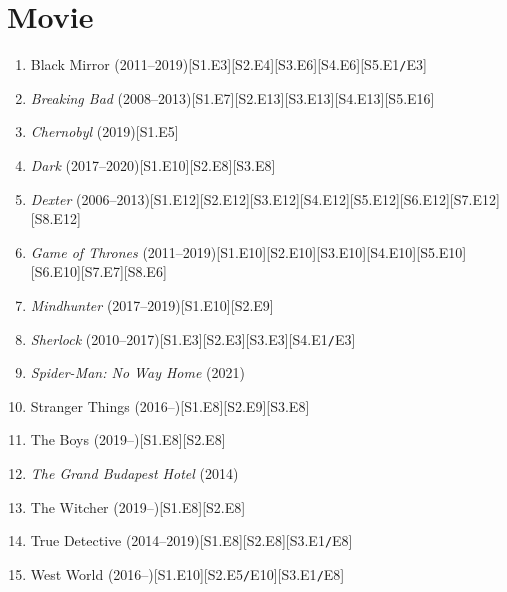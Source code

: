 \documentclass{article}
\begin{document}
\section{Movie}
\begin{enumerate}
	\item Black Mirror (2011--2019)\hfill[S1.E3][S2.E4][S3.E6][S4.E6][S5.E1\texttt{/}E3]
	\item \textit{Breaking Bad} (2008--2013)\hfill[S1.E7][S2.E13][S3.E13][S4.E13][S5.E16]
	\item \textit{Chernobyl} (2019)\hfill[S1.E5]
	\item \textit{Dark} (2017--2020)\hfill[S1.E10][S2.E8][S3.E8]
	\item \textit{Dexter} (2006--2013)\hfill[S1.E12][S2.E12][S3.E12][S4.E12][S5.E12][S6.E12][S7.E12][S8.E12]
	\item \textit{Game of Thrones} (2011--2019)\hfill[S1.E10][S2.E10][S3.E10][S4.E10][S5.E10][S6.E10][S7.E7][S8.E6]
	\item \textit{Mindhunter} (2017--2019)\hfill[S1.E10][S2.E9]
	\item \textit{Sherlock} (2010--2017)\hfill[S1.E3][S2.E3][S3.E3][S4.E1\texttt{/}E3]
	\item \textit{Spider-Man: No Way Home} (2021)
	\item Stranger Things (2016--)\hfill[S1.E8][S2.E9][S3.E8]
	\item The Boys (2019--)\hfill[S1.E8][S2.E8]
	\item \textit{The Grand Budapest Hotel} (2014)
	\item The Witcher (2019--)\hfill[S1.E8][S2.E8]
	\item True Detective (2014--2019)\hfill[S1.E8][S2.E8][S3.E1\texttt{/}E8]
	\item West World (2016--)\hfill[S1.E10][S2.E5\texttt{/}E10][S3.E1\texttt{/}E8]
\end{enumerate}
\end{document}
